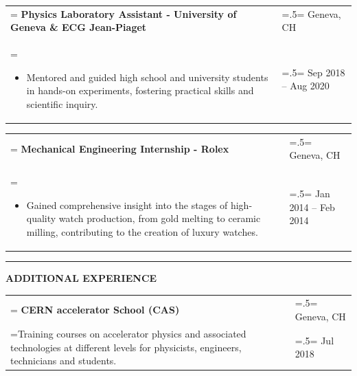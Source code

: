 \documentclass[letterpaper, 11pt]{article}
\begin{document}
\begin{tabularx}{1.0\textwidth} { 
   >{\raggedright\arraybackslash\hsize=1.5\hsize\linewidth=\hsize}X 
   >{\raggedleft\arraybackslash\hsize=.5\hsize\linewidth=\hsize}X }
\normalsize
\bf{Physics Laboratory Assistant - University of Geneva \& ECG Jean-Piaget} & Geneva, CH\\
\normalfont \begin{itemize}[leftmargin=*,noitemsep,topsep=0pt]
\item Mentored and guided high school and university students in hands-on experiments, fostering practical skills and scientific inquiry.
\end{itemize} & Sep 2018 -- Aug 2020
\end{tabularx}

\begin{tabularx}{1.0\textwidth} { 
   >{\raggedright\arraybackslash\hsize=1.5\hsize\linewidth=\hsize}X 
   >{\raggedleft\arraybackslash\hsize=.5\hsize\linewidth=\hsize}X }
\normalsize
\bf{Mechanical Engineering Internship - Rolex} & Geneva, CH\\
\normalfont \begin{itemize}[leftmargin=*,noitemsep,topsep=0pt]
\item Gained comprehensive insight into the stages of high-quality watch production, from gold melting to ceramic milling, contributing to the creation of luxury watches.
\end{itemize} & Jan 2014 --  Feb 2014
\end{tabularx}


\begin{center}
\noindent\rule{0.75\textwidth}{1pt}
\end{center}

\begin{center}
\large\bf{ADDITIONAL EXPERIENCE}
\end{center}

\begin{tabularx}{1.0\textwidth} { 
   >{\raggedright\arraybackslash\hsize=1.5\hsize\linewidth=\hsize}X 
   >{\raggedleft\arraybackslash\hsize=.5\hsize\linewidth=\hsize}X }
\normalsize
\bf{CERN accelerator School (CAS)} & Geneva, CH \\
\normalfont Training courses on accelerator physics and associated technologies at different levels for physicists, engineers, technicians and students. & Jul 2018
\end{tabularx}
\vspace{0.25cm}
\end{document}
